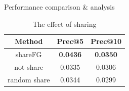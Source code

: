 \begin{section}{Performance comparison \& analysis}
    \par{
\begin{table}
\begin{center}
  \begin{tabular}{|c|c|c|}
    \hline
    Method&Prec@5&Prec@10\\
    \hline
    shareFG&\textbf{\color{red}0.0436}&\textbf{\color{red}0.0350}\\
    \hline
    not share&0.0335&0.0306\\
    \hline
    random share&0.0344&0.0299\\
    \hline
  \end{tabular}
\end{center}
\caption{The effect of sharing}
\label{sharing}
\end{table}
}
\end{section}

